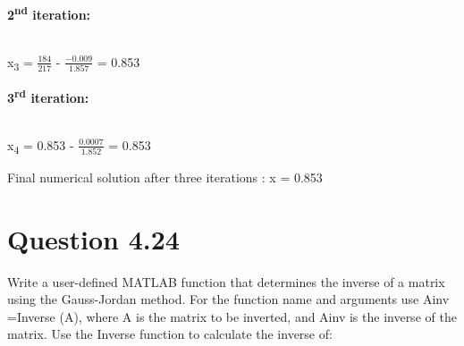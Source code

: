 \documentclass{report}
\begin{document}
            \textbf{2\textsuperscript{nd} iteration:}\\\\
            \begin{center}
                x\textsubscript{3} = $\frac{184}{217}$ - $\frac{-0.009}{1.857}$ = 0.853    
            \end{center}

            \textbf{3\textsuperscript{rd} iteration:}\\\\
            \begin{center}
                x\textsubscript{4} = 0.853 - $\frac{0.0007}{1.852}$ = 0.853    
            \end{center}

            Final numerical solution after three iterations : x = 0.853
            












































































    \section*{\hfil Question 4.24 \hfil}
    Write a user-defined MATLAB function that determines the inverse of a matrix using the Gauss-Jor­dan method. For the function name and arguments use Ainv =Inverse (A), where A is the 
    matrix to be inverted, and Ainv is the inverse of the matrix. Use the Inverse function to calculate the inverse of:
\end{document}
